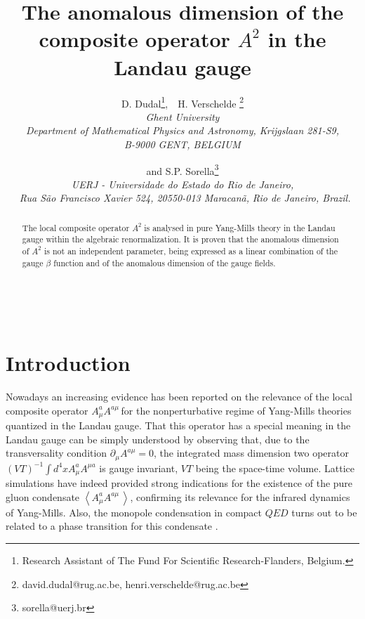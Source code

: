 \documentclass[a4paper,12pt]{article}
\begin{document}
\title{\textbf{The anomalous dimension of the composite operator }$A^{2}$ \textbf{%
in the Landau gauge}}
\author{D. Dudal\thanks{%
Research Assistant of The Fund For Scientific Research-Flanders, Belgium.},\
\ H. Verschelde \thanks{%
david.dudal@rug.ac.be, henri.verschelde@rug.ac.be} \\
{\small {\textit{Ghent University }}}\\
{\small {\textit{Department of Mathematical Physics and Astronomy,
Krijgslaan 281-S9, }}}\\
{\small {\textit{B-9000 GENT, BELGIUM}}} \and and S.P. Sorella\thanks{%
sorella@uerj.br} \\
{\small {\textit{UERJ - Universidade do Estado do Rio de Janeiro,}}} \\
{\small {\textit{\ Rua S\~{a}o Francisco Xavier 524, 20550-013 Maracan\~{a}, 
}}} {\small {\textit{Rio de Janeiro, Brazil.}}}}
\maketitle

\begin{abstract}
The local composite operator $A^{2}\;$is analysed in pure Yang-Mills theory
in the Landau gauge within the algebraic renormalization. It is proven that
the anomalous dimension of $A^{2}$ is not an independent parameter, being
expressed as a linear combination of the gauge $\beta $ function and of the
anomalous dimension of the gauge fields.
\end{abstract}

\vfill\newpage \ \makeatother

\renewcommand{\theequation}{\thesection.\arabic{equation}}

\section{Introduction}

Nowadays an increasing evidence has been reported on the relevance of the
local composite operator $A_{\mu }^{a}A^{a\mu \;}$for the nonperturbative
regime of Yang-Mills theories quantized in the Landau gauge. That this
operator has a special meaning in the Landau gauge can be simply understood
by observing that, due to the transversality condition $\partial _{\mu
}A^{a\mu }=0$, the integrated mass dimension two operator $\left( VT\right)
^{-1}\int d^{4}xA_{\mu }^{a}A^{\mu a}$ is gauge invariant, $VT$ being the
space-time volume. Lattice simulations \cite{b} have indeed provided strong
indications for the existence of the pure gluon condensate $\left\langle
A_{\mu }^{a}A^{a\mu \;}\right\rangle $, confirming its relevance for the
infrared dynamics of Yang-Mills. Also, the monopole condensation in compact $%
QED$ turns out to be related to a phase transition for this condensate \cite
{g}.
\end{document}
